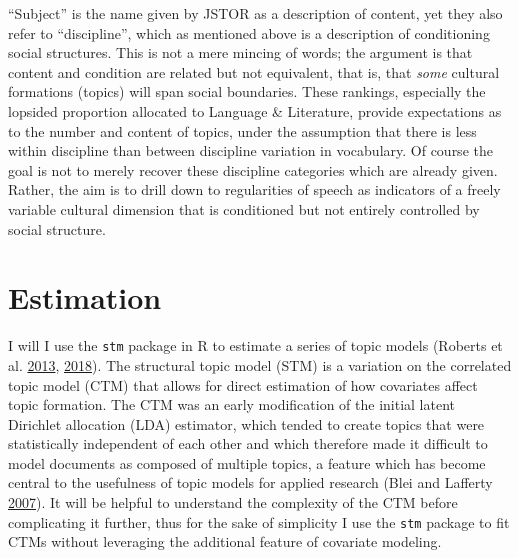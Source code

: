 \documentclass[]{book}
\theoremstyle{definition}
\theoremstyle{definition}
\theoremstyle{definition}
\theoremstyle{remark}
\begin{document}
``Subject'' is the name given by JSTOR as a description of content, yet
they also refer to ``discipline'', which as mentioned above is a
description of conditioning social structures. This is not a mere
mincing of words; the argument is that content and condition are related
but not equivalent, that is, that \emph{some} cultural formations
(topics) will span social boundaries. These rankings, especially the
lopsided proportion allocated to Language \& Literature, provide
expectations as to the number and content of topics, under the
assumption that there is less within discipline than between discipline
variation in vocabulary. Of course the goal is not to merely recover
these discipline categories which are already given. Rather, the aim is
to drill down to regularities of speech as indicators of a freely
variable cultural dimension that is conditioned but not entirely
controlled by social structure.

\hypertarget{estimation}{%
\section{Estimation}\label{estimation}}

I will I use the \texttt{stm} package in R to estimate a series of topic
models (Roberts et al.
\protect\hyperlink{ref-Roberts2013structural}{2013},
\protect\hyperlink{ref-Roberts2018stm}{2018}). The structural topic
model (STM) is a variation on the correlated topic model (CTM) that
allows for direct estimation of how covariates affect topic formation.
The CTM was an early modification of the initial latent Dirichlet
allocation (LDA) estimator, which tended to create topics that were
statistically independent of each other and which therefore made it
difficult to model documents as composed of multiple topics, a feature
which has become central to the usefulness of topic models for applied
research (Blei and Lafferty
\protect\hyperlink{ref-Blei2007correlated}{2007}). It will be helpful to
understand the complexity of the CTM before complicating it further,
thus for the sake of simplicity I use the \texttt{stm} package to fit
CTMs without leveraging the additional feature of covariate modeling.
\end{document}
